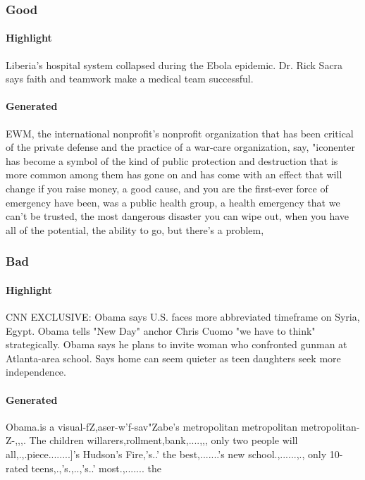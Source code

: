 \documentclass{article}
\begin{document}
\subsubsection{Good}

\paragraph{Highlight} 
Liberia's hospital system collapsed during the Ebola epidemic. Dr. Rick Sacra says faith and teamwork make a medical team successful.

\paragraph{Generated} 
EWM, the international nonprofit's nonprofit organization that has been critical of the private defense and the practice of a war-care organization, say, "iconenter has become a symbol of the kind of public protection and destruction that is more common among them has gone on and has come with an effect that will change if you raise money, a good cause, and you are the first-ever force of emergency have been, was a public health group, a health emergency that we can't be trusted, the most dangerous disaster you can wipe out, when you have all of the potential, the ability to go, but there's a problem,

\subsubsection{Bad}

\paragraph{Highlight}
CNN EXCLUSIVE: Obama says U.S. faces more abbreviated timeframe on Syria, Egypt. Obama tells "New Day" anchor Chris Cuomo "we have to think" strategically. Obama says he plans to invite woman who confronted gunman at Atlanta-area school. Says home can seem quieter as teen daughters seek more independence.

\paragraph{Generated} 
Obama.is a visual-fZ,aser-w'f-sav"Zabe's metropolitan metropolitan metropolitan-Z-,,,.
The children willarers,rollment,bank,....,,, only two people will all,.,.piece........]'s Hudson's Fire,'s..' the best,.......'s new school.,......,., only 10-rated teens,.,'s.,..,'s..' most.,....... the
\end{document}
